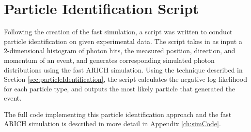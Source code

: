 \section{Particle Identification Script}
\label{sec:multi}
Following the creation of the fast simulation, a script was written to conduct particle identification on given experimental data.
The script takes in as input a 2-dimensional histogram of photon hits, the measured position, direction, and momentum of an event, and generates corresponding simulated photon distributions using the fast ARICH simulation.
Using the technique described in Section \ref{sec:particleIdentification}, the script calculates the negative log-likelihood for each particle type, and outputs the most likely particle that generated the event.

The full code implementing this particle identification approach and the fast ARICH simulation is described in more detail in Appendix \ref{ch:simCode}.

\endinput



\section{Comparison with Geant4} 
In this section, I will compare the simulated photon distribution between my simulation and the full Geant4 simulation.
They will be compared on a number of metrics, including the number of photons detected in the photon ring, and the level of background photons (determined by taking the ratio of histograms simulated by my simulation and by Geant4). This work is in progress: comparisons have been done, but it is still necessary to more accurately quantify the differences between the two simulations and display these results. I will describe the differences between my simulation and the full Geant4 simulation, and make the claim that my simulation contains enough of the necessary physics to simulate Cherenkov photons with sufficient accuracy for our purposes.

\section{Mirror}
In order to 


Any text after an \endinput is ignored.
You could put scraps here or things in progress.
